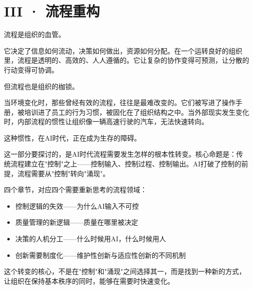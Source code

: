 \part{III · 流程重构}



流程是组织的血管。

它决定了信息如何流动，决策如何做出，资源如何分配。在一个运转良好的组织里，流程是透明的、高效的、人人遵循的。它让复杂的协作变得可预测，让分散的行动变得可协调。

但流程也是组织的枷锁。

当环境变化时，那些曾经有效的流程，往往是最难改变的。它们被写进了操作手册，被培训进了员工的行为习惯，被固化在了组织结构之中。当外部现实发生变化时，内部流程的惯性让组织像一辆高速行驶的汽车，无法快速转向。

这种惯性，在AI时代，正在成为生存的障碍。

这一部分要探讨的，是AI时代流程需要发生怎样的根本性转变。核心命题是：传统流程建立在"控制"之上——控制输入、控制过程、控制输出。AI打破了控制的前提，流程需要从"控制"转向"涌现"。

四个章节，对应四个需要重新思考的流程领域：
\begin{itemize}
\item 控制逻辑的失效——为什么AI输入不可控
\item 质量管理的新逻辑——质量在哪里被决定
\item 决策的人机分工——什么时候用AI，什么时候用人
\item 创新需要制度化——维护性创新与适应性创新的不同机制

\end{itemize}
这个转变的核心，不是在"控制"和"涌现"之间选择其一，而是找到一种新的方式，让组织在保持基本秩序的同时，能够在需要时快速变化。
